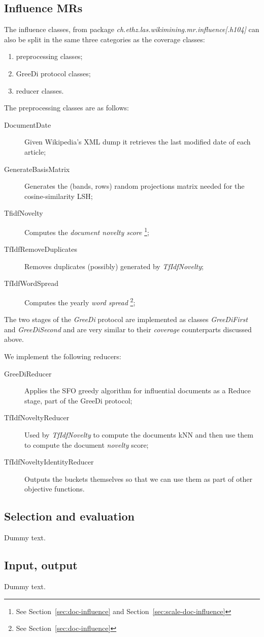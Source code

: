\subsection{Influence \aclp{MR}}

The influence classes, from package
\emph{ch.ethz.las.wikimining.mr.influence[.h104]} can also be split in the same
three categories as the coverage classes:
\begin{enumerate}
  \item preprocessing classes;
  \item GreeDi protocol classes;
  \item reducer classes.
\end{enumerate}

The preprocessing classes are as follows:
\begin{description}
  \item[DocumentDate] Given Wikipedia's \ac{XML} dump it retrieves the last
  modified date of each article;
  \item[GenerateBasisMatrix] Generates the (bands, rows) random projections
  matrix needed for the cosine-similarity \ac{LSH};
  \item[TfidfNovelty] Computes the \emph{document novelty score} \footnote{See
  Section~\vref{sec:doc-influence} and Section~\vref{sec:scale-doc-influence}};
  \item[TfIdfRemoveDuplicates] Removes duplicates (possibly) generated by
    \emph{TfIdfNovelty};
  \item[TfIdfWordSpread] Computes the yearly \emph{word spread} \footnote{See
    Section~\vref{sec:doc-influence}};
\end{description}

The two stages of the \emph{GreeDi} protocol are implemented as classes
\emph{GreeDiFirst} and \emph{GreeDiSecond} and are very similar to their
\emph{coverage} counterparts discussed above.

We implement the following reducers:
\begin{description}
  \item[GreeDiReducer] Applies the \ac{SFO} greedy algorithm for influential
  documents as a Reduce stage, part of the GreeDi protocol;
  \item[TfIdfNoveltyReducer] Used by \emph{TfIdfNovelty} to compute the
  documents \ac{kNN} and then use them to compute the document \emph{novelty}
  score;
  \item[TfIdfNoveltyIdentityReducer] Outputs the buckets themselves so that we
  can use them as part of other objective functions.
\end{description}

\subsection{Selection and evaluation}

Dummy text.

\subsection{Input, output}

Dummy text.

